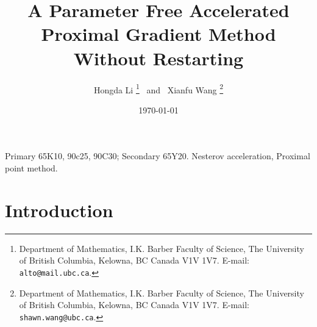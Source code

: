 \documentclass[12pt]{article}
\begin{document}
\title{{\selectfont 
        A Parameter Free Accelerated Proximal Gradient Method Without Restarting
    }}

\author{
    Hongda Li
    \thanks{Department of Mathematics, I.K. Barber Faculty of Science,
    The University of British Columbia, Kelowna, BC Canada V1V 1V7. E-mail:  \texttt{alto@mail.ubc.ca}.}~ and ~Xianfu Wang
    \thanks{Department of Mathematics, I.K. Barber Faculty of Science,
    The University of British Columbia, Kelowna, BC Canada V1V 1V7. E-mail:  \texttt{shawn.wang@ubc.ca}.}
}

\date{\today}

\maketitle


\begin{abstract} 
    \noindent
    
\end{abstract}
{
    Primary 65K10, 90c25, 90C30; Secondary 65Y20. 
     Nesterov acceleration, Proximal point method. 
}
\section{Introduction}
\end{document}

